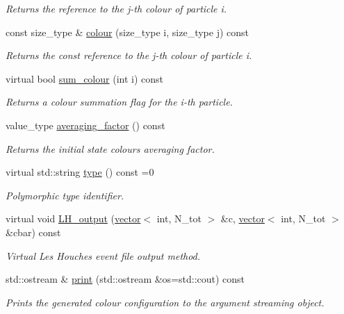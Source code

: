 \begin{DoxyCompactItemize}
\begin{DoxyCompactList}\small\item\em Returns the reference to the j-\/th colour of particle i. \end{DoxyCompactList}\item 
\hypertarget{a00078_af0e69b425bcd4c7c12a598e33671f672}{}const size\+\_\+type \& \hyperlink{a00078_af0e69b425bcd4c7c12a598e33671f672}{colour} (size\+\_\+type i, size\+\_\+type j) const \label{a00078_af0e69b425bcd4c7c12a598e33671f672}

\begin{DoxyCompactList}\small\item\em Returns the const reference to the j-\/th colour of particle i. \end{DoxyCompactList}\item 
virtual bool \hyperlink{a00078_ab7feac6ce81715acc83ac60b3d992129}{sum\+\_\+colour} (int i) const 
\begin{DoxyCompactList}\small\item\em Returns a colour summation flag for the i-\/th particle. \end{DoxyCompactList}\item 
\hypertarget{a00078_abf3501b50281c654cf52691b1123acd9}{}value\+\_\+type \hyperlink{a00078_abf3501b50281c654cf52691b1123acd9}{averaging\+\_\+factor} () const \label{a00078_abf3501b50281c654cf52691b1123acd9}

\begin{DoxyCompactList}\small\item\em Returns the initial state colours averaging factor. \end{DoxyCompactList}\item 
\hypertarget{a00078_a67ebadae11c823e70d4ff32cbe582051}{}virtual std\+::string \hyperlink{a00078_a67ebadae11c823e70d4ff32cbe582051}{type} () const =0\label{a00078_a67ebadae11c823e70d4ff32cbe582051}

\begin{DoxyCompactList}\small\item\em Polymorphic type identifier. \end{DoxyCompactList}\item 
\hypertarget{a00078_aa38500f37b0c93d47b15a295df352c00}{}virtual void \hyperlink{a00078_aa38500f37b0c93d47b15a295df352c00}{L\+H\+\_\+output} (\hyperlink{a00579}{vector}$<$ int, N\+\_\+tot $>$ \&c, \hyperlink{a00579}{vector}$<$ int, N\+\_\+tot $>$ \&cbar) const \label{a00078_aa38500f37b0c93d47b15a295df352c00}

\begin{DoxyCompactList}\small\item\em Virtual Les Houches event file output method. \end{DoxyCompactList}\item 
std\+::ostream \& \hyperlink{a00078_a788d9e734974be65bc030e08f044f1b9}{print} (std\+::ostream \&os=std\+::cout) const 
\begin{DoxyCompactList}\small\item\em Prints the generated colour configuration to the argument streaming object. \end{DoxyCompactList}\end{DoxyCompactItemize}
